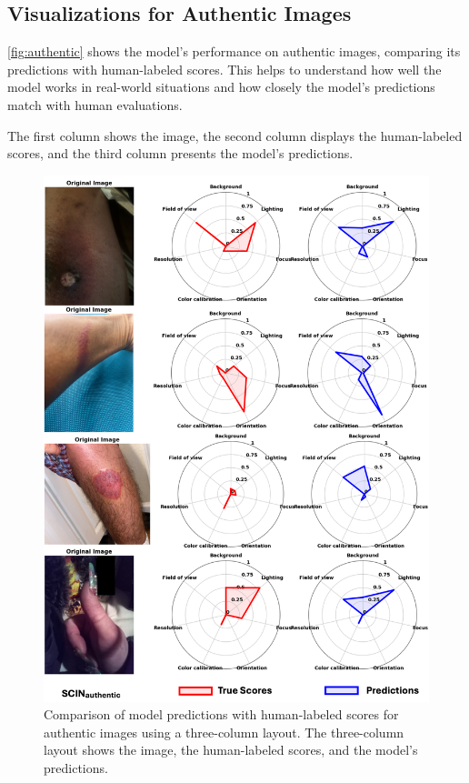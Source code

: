 \subsection{Visualizations for Authentic Images}
\label{subsec:AuthenticImages}
\autoref{fig:authentic} shows the model’s performance on authentic images, comparing its predictions with human-labeled scores. This helps to understand how well the model works in real-world situations and  how closely the model’s predictions match with human evaluations. \par
\vspace{\baselineskip}
\noindent
The first column shows the image, the second column displays the human-labeled scores, and the third column presents the model’s predictions. \par
\begin{figure}[ht]
    \centering
    \includegraphics[keepaspectratio,width=15cm]{img/authentic.png}
    \caption{Comparison of model predictions with human-labeled scores for authentic images using a three-column layout. The three-column layout shows the image, the human-labeled scores, and the model's predictions.}
    \label{fig:authentic}
\end{figure}


